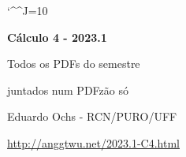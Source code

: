\documentclass[oneside,12pt]{article}
\begin{document}

\def\u#1{\par{\footnotesize \url{#1}}}

\def\drafturl{http://anggtwu.net/LATEX/2023-1-C4.pdf}
\def\drafturl{http://anggtwu.net/2023.1-C4.html}
\def\draftfooter{\tiny \href{\drafturl}{\jobname{}} \ColorBrown{\shorttoday{} \hours}}

\catcode`\^^J=10
\pu



%

\thispagestyle{empty}

\begin{center}

\vspace*{1.2cm}

{\bf \Large Cálculo 4 - 2023.1}

\bsk

Todos os PDFs do semestre

juntados num PDFzão só

\bsk

Eduardo Ochs - RCN/PURO/UFF

\url{http://anggtwu.net/2023.1-C4.html}

\end{center}

\newpage

\def\incl#1{}

\incl{2023-1-C4-intro}

\incl{2023-1-C4-dicas-pra-P1}

\incl{2023-1-C4-P1}

\incl{2023-1-C4-dicas-pra-P2}

\incl{2023-1-C4-P2}

\writetoc   %

\end{document}
